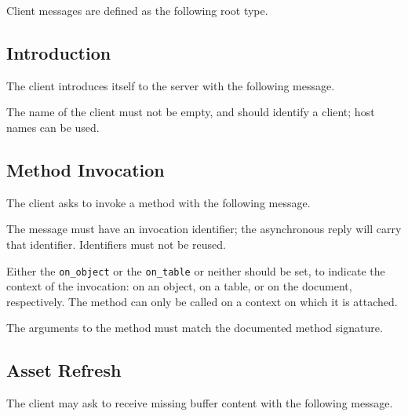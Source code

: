\documentclass[11pt, oneside]{amsart}
\begin{document}
Client messages are defined as the following root type.



\subsection{Introduction}

The client introduces itself to the server with the following message.



The name of the client must not be empty, and should identify a client; host names can be used.

\subsection{Method Invocation}
\label{sec:method_invoke}

The client asks to invoke a method with the following message.



The message must have an invocation identifier; the asynchronous reply will carry that identifier. Identifiers must not be reused.

Either the \texttt{on\_object} or the \texttt{on\_table} or neither should be set, to indicate the context of the invocation: on an object, on a table, or on the document, respectively. The method can only be called on a context on which it is attached.

The arguments to the method must match the documented method signature.

\subsection{Asset Refresh}
\label{sec:refresh_message}

The client may ask to receive missing buffer content with the following message.


\end{document}
